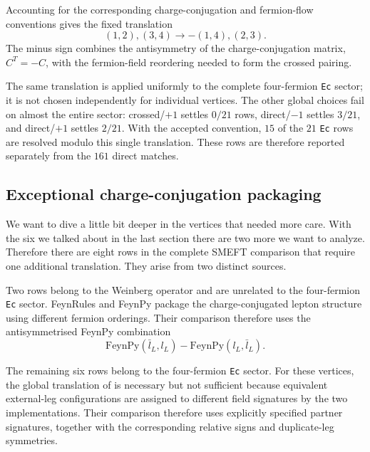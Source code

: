 Accounting for the corresponding charge-conjugation and fermion-flow conventions gives the fixed translation
\begin{equation}
    (1,2),(3,4)
    \longrightarrow
    -(1,4),(2,3).
    \label{eq:validation-ec-translation}
\end{equation}
The minus sign combines the antisymmetry of the charge-conjugation matrix, $C^T=-C$, with the fermion-field reordering needed to form the crossed pairing.

The same translation is applied uniformly to the complete four-fermion \texttt{Ec} sector; it is not chosen independently for individual vertices. The other global choices fail on almost the entire sector: crossed/$+1$ settles $0/21$ rows, direct/$-1$ settles $3/21$, and direct/$+1$ settles $2/21$. With the accepted convention, $15$ of the $21$ \texttt{Ec} rows are resolved modulo this single translation. These rows are therefore reported separately from the $161$ direct matches.


\subsection{Exceptional charge-conjugation packaging}
\label{sec:validation-ec-pinned}

We want to dive a little bit deeper in the vertices that needed more care. With the six we talked about in the last section there are two more we want to analyze. Therefore there are eight rows in the complete SMEFT comparison that require one additional translation. They arise from two distinct sources.

Two rows belong to the Weinberg operator and are unrelated to the four-fermion \texttt{Ec} sector. FeynRules and FeynPy package the charge-conjugated lepton structure using different fermion orderings. Their comparison therefore uses the antisymmetrised FeynPy combination
\begin{equation}
    \mathrm{FeynPy}(\bar l_L,l_L)
    -
    \mathrm{FeynPy}(l_L,\bar l_L).
\end{equation}

The remaining six rows belong to the four-fermion \texttt{Ec} sector. For these vertices, the global translation of  is necessary but not sufficient because equivalent external-leg configurations are assigned to different field signatures by the two implementations. Their comparison therefore uses explicitly specified partner signatures, together with the corresponding relative signs and duplicate-leg symmetries.

